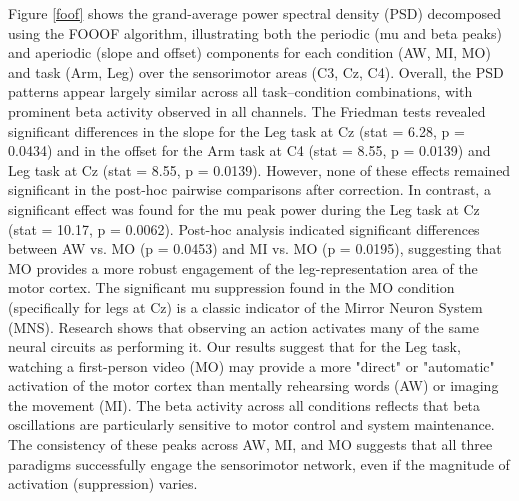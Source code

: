\documentclass[10pt,letterpaper]{article}
\begin{document}
Figure \ref{foof} shows the grand-average power spectral density (PSD) decomposed using the FOOOF algorithm, illustrating both the periodic (mu and beta peaks) and aperiodic (slope and offset) components for each condition (AW, MI, MO) and task (Arm, Leg) over the sensorimotor areas (C3, Cz, C4). Overall, the PSD patterns appear largely similar across all task–condition combinations, with prominent beta activity observed in all channels. The Friedman tests revealed significant differences in the slope for the Leg task at Cz (stat = 6.28, p = 0.0434) and in the offset for the Arm task at C4 (stat = 8.55, p = 0.0139) and Leg task at Cz (stat = 8.55, p = 0.0139). However, none of these effects remained significant in the post-hoc pairwise comparisons after correction. In contrast, a significant effect was found for the mu peak power during the Leg task at Cz (stat = 10.17, p = 0.0062). Post-hoc analysis indicated significant differences between AW vs. MO (p = 0.0453) and MI vs. MO (p = 0.0195), suggesting that MO provides a more robust engagement of the leg-representation area of the motor cortex. The significant mu suppression found in the MO condition (specifically for legs at Cz) is a classic indicator of the Mirror Neuron System (MNS). Research shows that observing an action activates many of the same neural circuits as performing it. Our results suggest that for the Leg task, watching a first-person video (MO) may provide a more "direct" or "automatic" activation of the motor cortex than mentally rehearsing words (AW) or imaging the movement (MI).
The beta activity across all conditions reflects that beta oscillations are particularly sensitive to motor control and system maintenance. The consistency of these peaks across AW, MI, and MO suggests that all three paradigms successfully engage the sensorimotor network, even if the magnitude of activation (suppression) varies.

\end{document}
